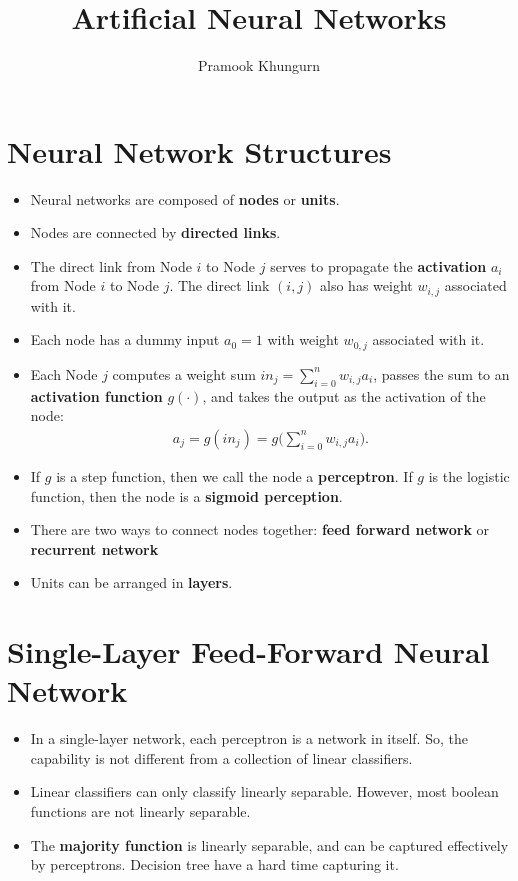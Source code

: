 \documentclass[10pt]{article}
\title{Artificial Neural Networks}
\author{Pramook Khungurn}
\begin{document}
\maketitle

\section{Neural Network Structures}
\begin{itemize}
    \item Neural networks are composed of {\bf nodes} or {\bf units}.
    \item Nodes are connected by {\bf directed links}. 
    \item The direct link from Node $i$ to Node $j$ serves to
        propagate the {\bf activation} $a_i$ from Node $i$ 
        to Node $j$. The direct link $(i,j)$ also has weight
        $w_{i,j}$ associated with it.
    \item Each node has a dummy input $a_0 = 1$ with weight 
        $w_{0,j}$ associated with it.
    \item Each Node $j$ computes a weight sum $in_j = \sum_{i=0}^n w_{i,j} a_i$, passes the sum to an {\bf activation function}
        $g(\cdot)$, and takes the output as the activation
        of the node:
        \begin{align*}
            a_j = g(in_j) = g\bigg( \sum_{i=0}^n w_{i,j} a_i \bigg).
        \end{align*}        
    \item If $g$ is a step function, then we call the node
        a {\bf perceptron}. If $g$ is the logistic function,
        then the node is a {\bf sigmoid perception}.
    \item There are two ways to connect nodes together:
        {\bf feed forward network} or {\bf recurrent network}
    \item Units can be arranged in {\bf layers}.
\end{itemize}

\section{Single-Layer Feed-Forward Neural Network}

\begin{itemize}
    \item In a single-layer network, each perceptron is a
    network in itself. So, the capability is not different
    from a collection of linear classifiers.
    
    \item Linear classifiers can only classify linearly
        separable. However, most boolean functions are 
        not linearly separable.
        
    \item The {\bf majority function} is linearly separable,
        and can be captured effectively by perceptrons.        
        Decision tree have a hard time capturing it.    
\end{itemize}
\end{document}
